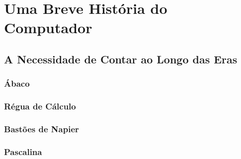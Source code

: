 
\chapter{Uma Breve História do Computador}
\label{cap:historia-computador}

\section{A Necessidade de Contar ao Longo das Eras}

\subsection{Ábaco}

\subsection{Régua de Cálculo}

\subsection{Bastões de Napier}

\subsection{Pascalina}